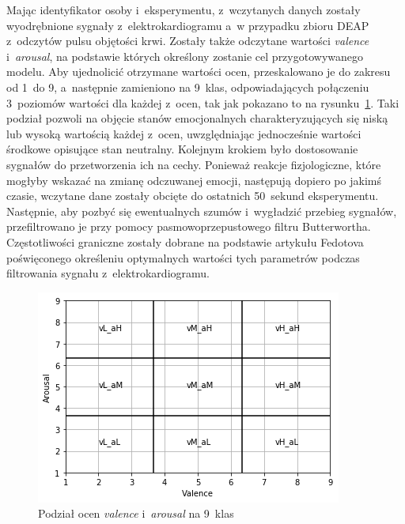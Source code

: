 Mając identyfikator osoby i~eksperymentu, z~wczytanych danych zostały wyodrębnione sygnały z~elektrokardiogramu a~w przypadku zbioru DEAP z~odczytów pulsu objętości krwi. Zostały także odczytane wartości \textit{valence} i~\textit{arousal}, na podstawie których określony zostanie cel przygotowywanego modelu. Aby ujednolicić otrzymane wartości ocen, przeskalowano je do zakresu od 1~do 9, a~następnie zamieniono na 9~klas, odpowiadających połączeniu 3~poziomów wartości dla każdej z~ocen, tak jak pokazano to na rysunku~\ref{fig:model_classes}. Taki podział pozwoli na objęcie stanów emocjonalnych charakteryzujących się niską lub wysoką wartością każdej z~ocen, uwzględniając jednocześnie wartości środkowe opisujące stan neutralny. Kolejnym krokiem było dostosowanie sygnałów do przetworzenia ich na cechy. Ponieważ reakcje fizjologiczne, które mogłyby wskazać na zmianę odczuwanej emocji, następują dopiero po jakimś czasie, wczytane dane zostały obcięte do ostatnich 50~sekund eksperymentu. Następnie, aby pozbyć się ewentualnych szumów i~wygładzić przebieg sygnałów, przefiltrowano je przy pomocy pasmowoprzepustowego filtru Butterwortha. Częstotliwości graniczne zostały dobrane na podstawie artykułu Fedotova~\cite{fedotov_optimal_cutoff_2016} poświęconego określeniu optymalnych wartości tych parametrów podczas filtrowania sygnału z~elektrokardiogramu.
\begin{figure}
	\centering
	\includegraphics[width=0.5\linewidth]{images/model_classes.png}
	\caption{Podział ocen \textit{valence} i~\textit{arousal} na 9~klas}
	\label{fig:model_classes}
\end{figure}

